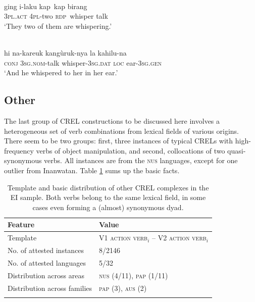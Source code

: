 \ea \label{WesternPantar030}
\\
\gll ging i-laku kap~kap birang \\
\textsc{3}\textsc{pl}.\textsc{act} \textsc{4}\textsc{pl}-two \textsc{rdp}~whisper talk \\
\glft `They two of them are whispering.'\\ 
\z

\ea \label{Kambera004}
\\
\gll hi na-kareuk kangùruk-nya la kahilu-na \\
\textsc{conj} \textsc{3}\textsc{sg}.\textsc{nom}-talk whisper-\textsc{3}\textsc{sg}.\textsc{dat} \textsc{loc} ear-\textsc{3}\textsc{sg}.\textsc{gen} \\
\glft `And he whispered to her in her ear.'\\ 
\z

\subsection{Other} \label{sec:other}
The last group of CREL constructions to be discussed here involves a heterogeneous set of verb combinations from lexical fields of various origins. There seem to be two groups: first, three instances of typical CRELs with high-frequency verbs of object manipulation, and second, collocations of two quasi-synonymous verbs. All instances are from the \textsc{nus} languages, except for one outlier from Inanwatan. Table \ref{table:basiccrelother} sums up the basic facts.

\begin{table}
\begin{tabular}{ll}
\lsptoprule
Feature&Value\tabularnewline
\midrule
Template&V1 \textsc{action verb}$_{i}$ -- V2 \textsc{action verb}$_{i}$\tabularnewline
No. of attested instances& 8/2146 \tabularnewline
No. of attested languages& 5/32 \tabularnewline
Distribution across areas& \textsc{nus} (4/11), \textsc{pap} (1/11) \tabularnewline
Distribution across families& \textsc{pap} (3), \textsc{aus} (2) \tabularnewline
\lspbottomrule
\end{tabular}
\caption[Template and basic distribution of other CREL complexes]{Template and basic distribution of other CREL complexes in the EI sample. Both verbs belong to the same lexical field, in some cases even forming a (almost) synonymous dyad.}
\label{table:basiccrelother}
\end{table}

